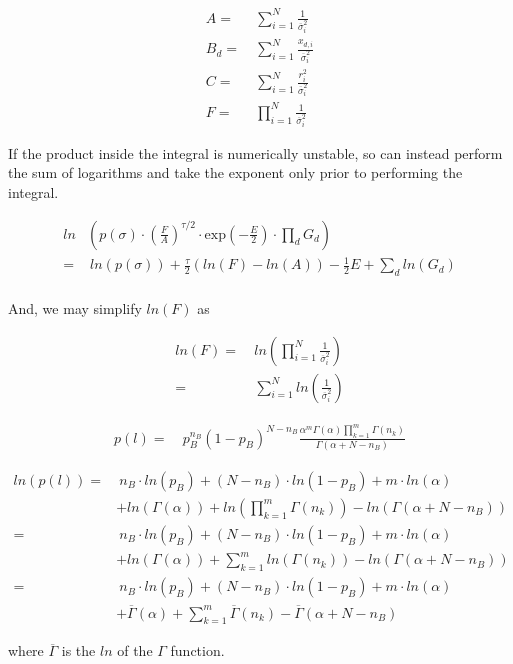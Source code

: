 \documentclass{article}
\newcommand{\sig}{\overline{\sigma}_i}
\newcommand{\eq}{=&\ }
\begin{document}
\begin{align}
  A \eq \sum_{i=1}^{N}\frac{1}{\sig^2} \\
  B_d \eq \sum_{i=1}^{N}\frac{x_{d,i}}{\sig^2} \\
  C \eq \sum_{i=1}^{N}\frac{r_i^2}{\sig^2} \\
  F \eq \prod_{i=1}^{N} \frac{1}{\sig^2}  
\end{align} 



If the product inside the integral is numerically unstable, so can instead perform the sum of logarithms and take the exponent only prior to performing the integral.

\begin{align}
  ln & \left( p(\sigma)\cdot \left(\frac{F}{A}\right)^{\tau/2} \cdot\text{exp}\left(-\frac{E}{2}\right) \cdot \prod_d G_d \right) \nonumber \\
     \eq ln\left(p(\sigma)\right) + \frac{\tau}{2}\left( ln\left(F\right) - ln\left(A\right)\right) - \frac{1}{2}E + \sum_d ln\left(G_d\right) \\
\end{align}

And, we may simplify $ln\left(F\right)$ as

\begin{align}
  ln\left(F\right) \eq ln\left(\prod_{i=1}^{N} \frac{1}{\sig^2}\right) \\
                    \eq \sum_{i=1}^{N} ln\left(\frac{1}{\sig^2}\right)
\end{align}

\newpage

\begin{align}
  p(l) \eq p_B^{n_B}\left(1-p_B\right)^{N-n_B}\frac{\alpha^m\Gamma(\alpha)\prod_{k=1}^{m}\Gamma(n_k)}{\Gamma(\alpha + N - n_B) }
\end{align}

\begin{align}
  ln\left(p\left(l\right)\right) \eq n_{B}\cdot ln\left(p_B\right) + (N-n_B)\cdot ln\left(1-p_B\right) + m\cdot ln\left(\alpha\right) \nonumber \\
    & + ln\left(\Gamma\left(\alpha\right)\right) + ln\left(\prod_{k=1}^{m}\Gamma\left(n_k\right)\right) - ln\left(\Gamma\left(\alpha + N - n_B\right)\right) \\
    \eq n_{B}\cdot ln\left(p_B\right) + (N-n_B)\cdot ln\left(1-p_B\right) + m\cdot ln\left(\alpha\right) \nonumber \\
    & + ln\left(\Gamma\left(\alpha\right)\right) + \sum_{k=1}^{m}ln\left(\Gamma\left(n_k\right)\right) - ln\left(\Gamma\left(\alpha + N - n_B\right)\right) \\
    \eq n_{B}\cdot ln\left(p_B\right) + (N-n_B)\cdot ln\left(1-p_B\right) + m\cdot ln\left(\alpha\right) \nonumber \\
    & + \overline{\Gamma}\left(\alpha\right) + \sum_{k=1}^{m}\overline{\Gamma}\left(n_k\right) - \overline{\Gamma}\left(\alpha + N - n_B\right)                        
\end{align}

where $\overline{\Gamma}$ is the $ln$ of the $\Gamma$ function.
\end{document}

